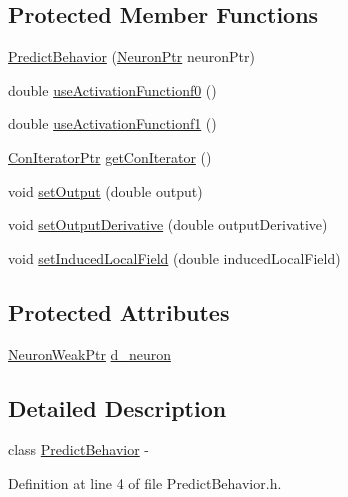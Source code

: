 \subsection*{Protected Member Functions}
\begin{DoxyCompactItemize}
\item 
\hyperlink{class_predict_behavior_add88913e7919dac8083e422adfaf9121}{PredictBehavior} (\hyperlink{_a_m_o_r_e_8h_ac1ea936c2c7728eb382278131652fef4}{NeuronPtr} neuronPtr)
\item 
double \hyperlink{class_predict_behavior_a699f23b6abd42f900ef991ac172a6f64}{useActivationFunctionf0} ()
\item 
double \hyperlink{class_predict_behavior_a2af882d5e647130684979b885de3082f}{useActivationFunctionf1} ()
\item 
\hyperlink{_a_m_o_r_e_8h_a819efaf710ead601ac8241df5e235dd8}{ConIteratorPtr} \hyperlink{class_predict_behavior_ae13310624d8ea02168c15e86759758fc}{getConIterator} ()
\item 
void \hyperlink{class_predict_behavior_afeabe1f543e46d41909b41816d8210a6}{setOutput} (double output)
\item 
void \hyperlink{class_predict_behavior_a59cb660d082154f8e72f0ce2281f1b0f}{setOutputDerivative} (double outputDerivative)
\item 
void \hyperlink{class_predict_behavior_ae0c61e493d55b658161b96a8d7b62819}{setInducedLocalField} (double inducedLocalField)
\end{DoxyCompactItemize}
\subsection*{Protected Attributes}
\begin{DoxyCompactItemize}
\item 
\hyperlink{_a_m_o_r_e_8h_a3e2d414e247d33f77957e70765d161c0}{NeuronWeakPtr} \hyperlink{class_predict_behavior_a49a9daba3c9e798fc7815ac44b645dc0}{d\_\-neuron}
\end{DoxyCompactItemize}


\subsection{Detailed Description}
class \hyperlink{class_predict_behavior}{PredictBehavior} -\/ 

Definition at line 4 of file PredictBehavior.h.



